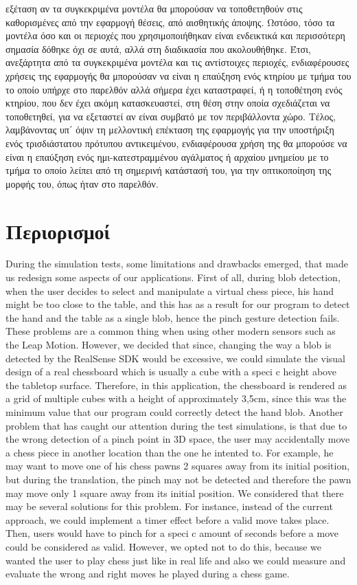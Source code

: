 εξέταση αν τα συγκεκριμένα μοντέλα θα μπορούσαν να τοποθετηθούν στις καθορισμένες από την εφαρμογή θέσεις, από αισθητικής άποψης. Ωστόσο, τόσο τα μοντέλα όσο και οι περιοχές που χρησιμοποιήθηκαν είναι ενδεικτικά και περισσότερη σημασία δόθηκε όχι σε αυτά, αλλά στη διαδικασία που ακολουθήθηκε. Έτσι, ανεξάρτητα από τα συγκεκριμένα μοντέλα και τις αντίστοιχες περιοχές, ενδιαφέρουσες χρήσεις της εφαρμογής θα μπορούσαν να είναι η επαύξηση ενός κτηρίου με τμήμα του το οποίο υπήρχε στο παρελθόν αλλά σήμερα έχει καταστραφεί, ή η τοποθέτηση ενός κτηρίου, που δεν έχει ακόμη κατασκευαστεί, στη θέση στην οποία σχεδιάζεται να τοποθετηθεί, για να εξεταστεί αν είναι συμβατό με τον περιβάλλοντα χώρο. Τέλος, λαμβάνοντας υπ΄ όψιν τη μελλοντική επέκταση της εφαρμογής για την υποστήριξη ενός τρισδιάστατου πρότυπου αντικειμένου, ενδιαφέρουσα χρήση της θα μπορούσε να είναι η επαύξηση ενός ημι-κατεστραμμένου αγάλματος ή αρχαίου μνημείου με το τμήμα το οποίο λείπει από τη σημερινή κατάστασή του, για την οπτικοποίηση της μορφής του, όπως ήταν στο παρελθόν.


\section{Περιορισμοί}
During the simulation tests, some limitations and drawbacks emerged, that made us redesign some aspects of our applications. First of all, during blob detection, when the user decides to select and manipulate a virtual chess piece, his hand might be too close to the table, and this has as a result for our program to detect the hand and the table as a single blob, hence the pinch gesture detection fails. These problems are a common thing when using other modern sensors such as the Leap Motion. However, we decided that since, changing the way a blob is detected by the RealSense SDK would be excessive, we could simulate the visual design of a real chessboard which is usually a cube with a speci c height above the tabletop surface. Therefore, in this application, the chessboard is rendered as a grid of multiple cubes with a height of approximately 3,5cm, since this was the minimum value that our program could correctly detect the hand blob. Another problem that has caught our attention during the test simulations, is that due to the wrong detection of a pinch point in 3D space, the user may accidentally move a chess piece in another location than the one he intented to. For example, he may want to move one of his chess pawns 2 squares away from its initial position, but during the translation, the pinch may not be detected and therefore the pawn may move only 1 square away from its initial position. We considered that there may be several solutions for this problem. For instance, instead of the current approach, we could implement a timer effect before a valid move takes place. Then, users would have to pinch for a speci c amount of seconds before a move could be considered as valid. However, we opted not to do this, because we wanted the user to play chess just like in real life and also we could measure and evaluate the wrong and right moves he played during a chess game.

